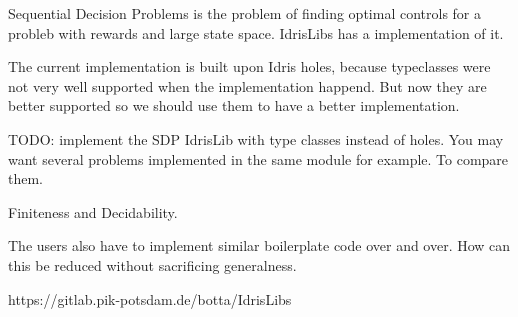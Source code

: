 \documentclass{scrartcl}
\begin{document}
Sequential Decision Problems is the problem of finding optimal controls for
a probleb with rewards and large state space. IdrisLibs has a implementation of
it.

The current implementation is built upon Idris holes, because typeclasses were
not very well supported when the implementation happend. But now they are
better supported so we should use them to have a better implementation.

TODO: implement the SDP IdrisLib with type classes instead of holes. You may
want several problems implemented in the same module for example. To compare
them.

Finiteness and Decidability.

The users also have to implement similar boilerplate code over and over. How
can this be reduced without sacrificing generalness.

https://gitlab.pik-potsdam.de/botta/IdrisLibs
~\cite{sdpcontrib}
~\cite{sdpcomp}





\end{document}
